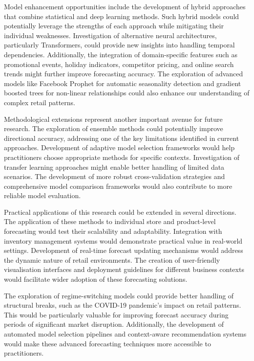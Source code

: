 \documentclass[12pt,a4paper]{report}
\begin{document}
Model enhancement opportunities include the development of hybrid approaches that combine statistical and deep learning methods. Such hybrid models could potentially leverage the strengths of each approach while mitigating their individual weaknesses. Investigation of alternative neural architectures, particularly Transformers, could provide new insights into handling temporal dependencies. Additionally, the integration of domain-specific features such as promotional events, holiday indicators, competitor pricing, and online search trends might further improve forecasting accuracy. The exploration of advanced models like Facebook Prophet for automatic seasonality detection and gradient boosted trees for non-linear relationships could also enhance our understanding of complex retail patterns.

Methodological extensions represent another important avenue for future research. The exploration of ensemble methods could potentially improve directional accuracy, addressing one of the key limitations identified in current approaches. Development of adaptive model selection frameworks would help practitioners choose appropriate methods for specific contexts. Investigation of transfer learning approaches might enable better handling of limited data scenarios. The development of more robust cross-validation strategies and comprehensive model comparison frameworks would also contribute to more reliable model evaluation.

Practical applications of this research could be extended in several directions. The application of these methods to individual store and product-level forecasting would test their scalability and adaptability. Integration with inventory management systems would demonstrate practical value in real-world settings. Development of real-time forecast updating mechanisms would address the dynamic nature of retail environments. The creation of user-friendly visualisation interfaces and deployment guidelines for different business contexts would facilitate wider adoption of these forecasting solutions.

The exploration of regime-switching models could provide better handling of structural breaks, such as the COVID-19 pandemic's impact on retail patterns. This would be particularly valuable for improving forecast accuracy during periods of significant market disruption. Additionally, the development of automated model selection pipelines and context-aware recommendation systems would make these advanced forecasting techniques more accessible to practitioners.
\end{document}
